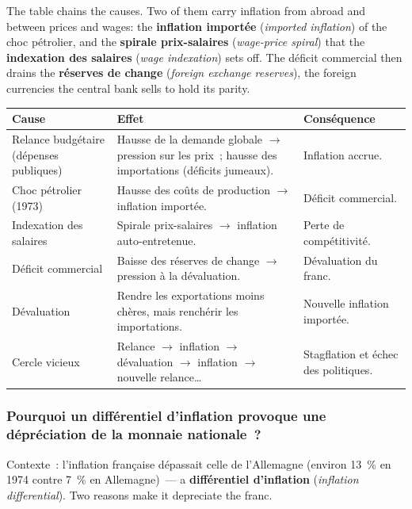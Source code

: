 The table chains the causes. Two of them carry inflation from abroad and between prices
and wages: the \textbf{inflation importée} (\textit{imported inflation}) of the choc
pétrolier, and the \textbf{spirale prix-salaires} (\textit{wage-price spiral}) that the
\textbf{indexation des salaires} (\textit{wage indexation}) sets off. The déficit commercial
then drains the \textbf{réserves de change} (\textit{foreign exchange reserves}), the
foreign currencies the central bank sells to hold its parity.

\begin{center}
  \small
  \begin{tabularx}{\textwidth}{>{\raggedright\arraybackslash}p{3.2cm}
      >{\raggedright\arraybackslash}X >{\raggedright\arraybackslash}p{4.2cm}}
    \toprule
    Cause & Effet & Conséquence \\
    \midrule
    Relance budgétaire (dépenses publiques) & Hausse de la demande globale $\to$
      pression sur les prix~; hausse des importations (déficits jumeaux). & Inflation
      accrue. \\
    \addlinespace
    Choc pétrolier (1973) & Hausse des coûts de production $\to$ inflation importée. &
      Déficit commercial. \\
    \addlinespace
    Indexation des salaires & Spirale prix-salaires $\to$ inflation auto-entretenue. &
      Perte de compétitivité. \\
    \addlinespace
    Déficit commercial & Baisse des réserves de change $\to$ pression à la dévaluation.
      & Dévaluation du franc. \\
    \addlinespace
    Dévaluation & Rendre les exportations moins chères, mais renchérir les importations.
      & Nouvelle inflation importée. \\
    \addlinespace
    Cercle vicieux & Relance $\to$ inflation $\to$ dévaluation $\to$ inflation $\to$
      nouvelle relance\ldots & Stagflation et échec des politiques. \\
    \bottomrule
  \end{tabularx}
\end{center}

\subsubsection{Pourquoi un différentiel d'inflation provoque une dépréciation de la monnaie nationale~?}

Contexte~: l'inflation française dépassait celle de l'Allemagne (environ 13~\% en 1974
contre 7~\% en Allemagne)~--- a \textbf{différentiel d'inflation} (\textit{inflation
differential}). Two reasons make it depreciate the franc.\\

